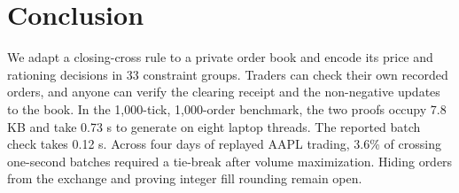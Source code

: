 \section{Conclusion}

We adapt a closing-cross rule to a private order book and encode its price and rationing decisions in 33 constraint groups. Traders can check their own recorded orders, and anyone can verify the clearing receipt and the non-negative updates to the book. In the 1,000-tick, 1,000-order benchmark, the two proofs occupy 7.8 KB and take 0.73 s to generate on eight laptop threads. The reported batch check takes 0.12 s. Across four days of replayed AAPL trading, 3.6\% of crossing one-second batches required a tie-break after volume maximization. Hiding orders from the exchange and proving integer fill rounding remain open.

